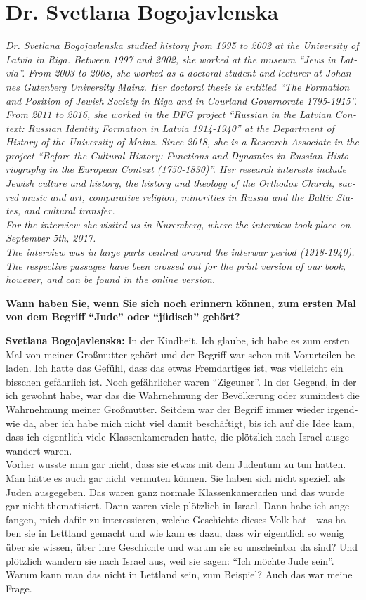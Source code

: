 \section{Dr. Svetlana Bogojavlenska}
\begin{otherlanguage}{ngerman}
\textit{Dr. Svetlana Bogojavlenska studied history from 1995 to 2002 at the University of Latvia in Riga. Between 1997 and 2002, she worked at the museum ``Jews in Latvia''. From 2003 to 2008, she worked as a doctoral student and lecturer at Johannes Gutenberg University Mainz. Her doctoral thesis is entitled ``The Formation and Position of Jewish Society in Riga and in Courland Governorate 1795-1915''. From 2011 to 2016, she worked in the DFG project ``Russian in the Latvian Context: Russian Identity Formation in Latvia 1914-1940'' at the Department of History of the University of Mainz. Since 2018, she is a Research Associate in the project ``Before the Cultural History: Functions and Dynamics in Russian Historiography in the European Context (1750-1830)''. Her research interests include Jewish culture and history, the history and theology of the Orthodox Church, sacred music and art, comparative religion, minorities in Russia and the Baltic States, and cultural transfer.\\
For the interview she visited us in Nuremberg, where the interview took place on September 5th, 2017. \\
The interview was in large parts centred around the interwar period (1918-1940). The respective passages have been crossed out for the print version of our book, however, and can be found in the online version.}\par
\vspace*{2em}
\textbf{Wann haben Sie, wenn Sie sich noch erinnern können, zum ersten Mal von dem Begriff "`Jude"' oder "`jüdisch"' gehört?}

\textbf{Svetlana Bogojavlenska:} In der Kindheit. Ich glaube, ich habe es zum ersten Mal von meiner Großmutter gehört und der Begriff war schon mit Vorurteilen beladen. Ich hatte das Gefühl, dass das etwas Fremdartiges ist, was vielleicht ein bisschen gefährlich ist. Noch gefährlicher waren "`Zigeuner"'. In der Gegend, in der ich gewohnt habe, war das die Wahrnehmung der Bevölkerung oder zumindest die Wahrnehmung meiner Großmutter. Seitdem war der Begriff immer wieder irgendwie da, aber ich habe mich nicht viel damit beschäftigt, bis ich auf die Idee kam, dass ich eigentlich viele Klassenkameraden hatte, die plötzlich nach Israel ausgewandert waren.\\
Vorher wusste man gar nicht, dass sie etwas mit dem Judentum zu tun hatten. Man hätte es auch gar nicht vermuten können. Sie haben sich nicht speziell als Juden ausgegeben. Das waren ganz normale Klassenkameraden und das wurde gar nicht thematisiert. Dann waren viele plötzlich in Israel. Dann habe ich angefangen, mich dafür zu interessieren, welche Geschichte dieses Volk hat - was haben sie in Lettland gemacht und wie kam es dazu, dass wir eigentlich so wenig über sie wissen, über ihre Geschichte und warum sie so unscheinbar da sind? Und plötzlich wandern sie nach Israel aus, weil sie sagen: "`Ich möchte Jude sein"'. Warum kann man das nicht in Lettland sein, zum Beispiel? Auch das war meine Frage.


\end{otherlanguage}
